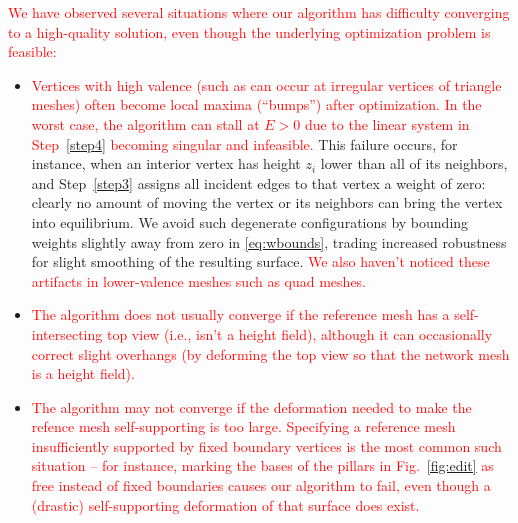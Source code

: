 \documentclass[annual]{acmsiggraph}
\newcommand{\newtext}[1]{\textcolor{red}{#1}}
\begin{document}
\newtext{We have observed several situations where our algorithm has difficulty converging to a high-quality solution, even though the underlying optimization problem is feasible:}
\begin{itemize}
\item \newtext{Vertices with high valence (such as can occur at irregular vertices of triangle meshes) often become local maxima (``bumps'') after optimization. In the worst case, the algorithm can stall at $E>0$ due to the linear system in Step~\ref{step4} becoming singular and infeasible.} This failure occurs, for instance, when an
interior vertex has height $z_i$ lower than all of its neighbors, and
Step~\ref{step3} assigns all incident edges to that vertex a weight of
zero: clearly no amount of moving the vertex or its neighbors can bring
the vertex into equilibrium. We avoid such degenerate configurations by
bounding weights slightly away from zero in \eqref{eq:wbounds}, trading
increased robustness for slight smoothing of the resulting surface. \newtext{We also haven't noticed these artifacts in lower-valence meshes such as quad meshes.}
\item \newtext{The algorithm does not usually converge if the reference mesh has a self-intersecting top view (i.e., isn't a height field), although it can occasionally correct slight overhangs (by deforming the top view so that the network mesh is a height field).}
\item \newtext{The algorithm may not converge if the deformation needed to make the refence mesh self-supporting is too large. Specifying a reference mesh insufficiently supported by fixed boundary vertices is the most common such situation -- for instance, marking the bases of the pillars in Fig.~\ref{fig:edit} as free instead of fixed boundaries causes our algorithm to fail, even though a (drastic) self-supporting deformation of that surface does exist.}
\end{itemize}
\end{document}
